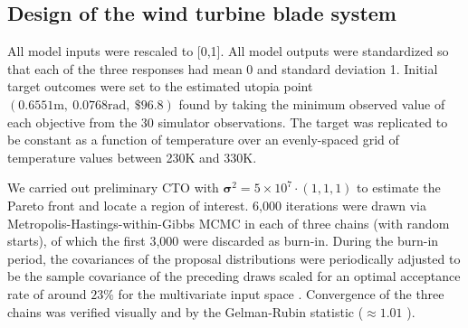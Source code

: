 \documentclass[twocolumn,10pt]{asme2ej}
\begin{document}
\subsection{Design of the wind turbine blade system}\label{the_model}
%
All model inputs were rescaled to [0,1]. 
%
All model outputs were standardized so that each of the three responses had mean 0 and standard deviation 1.
%
%
Initial target outcomes were set to the estimated utopia point $(0.6551\mathrm{m},\ 0.0768\mathrm{rad},\ \$96.8)$ found by taking the minimum observed value of each objective from the 30 simulator observations. 
%
The target was replicated to be constant as a function of temperature over an evenly-spaced grid of temperature values between 230K and 330K.
%

We carried out preliminary CTO with $\boldsymbol\sigma^2=5\times10^7\cdot(1,1,1)$ to estimate the Pareto front and locate a region of interest. %
%
6,000 iterations were drawn via Metropolis-Hastings-within-Gibbs MCMC \cite{Metropolis1953, Hastings1970, Geman1984} in each of three chains (with random starts), of which the first 3,000 were discarded as burn-in. 
%
During the burn-in period, the covariances of the proposal distributions were periodically adjusted to be the sample covariance of the preceding draws scaled for an optimal acceptance rate of around $23\%$ for the multivariate input space \cite{Roberts1997,Gelman2013}. %
%
%
%
Convergence of the three chains was verified visually and by the Gelman-Rubin statistic ($\approx1.01$ \cite{Gelman1992a}).
%
\end{document}
